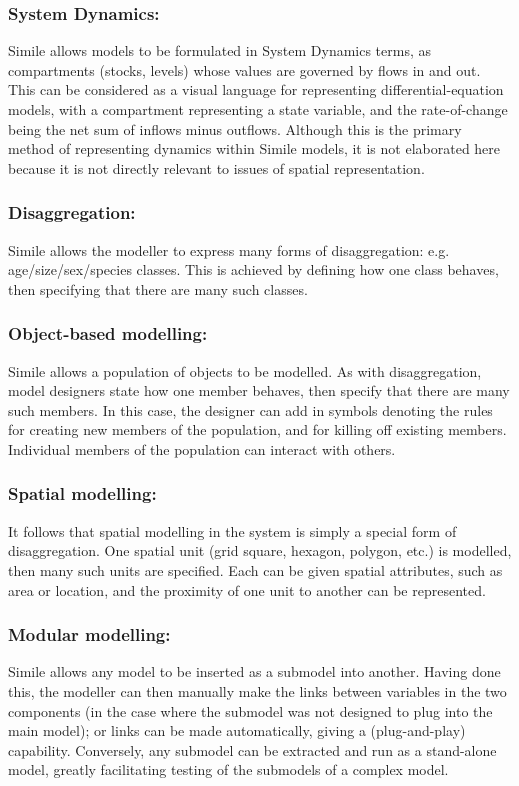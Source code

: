 	\subsubsection{System Dynamics:}
Simile allows models to be formulated in System Dynamics terms, as compartments (stocks, levels) whose values are governed by flows in and out. This can be considered as a visual language for representing differential-equation models, with a compartment representing a state variable, and the rate-of-change being the net sum of inflows minus outflows. Although this is the primary method of representing dynamics within Simile models, it is not elaborated here because it is not directly relevant to issues of spatial representation.
	\subsubsection{Disaggregation:}
Simile allows the modeller to express many forms of disaggregation: e.g. age/size/sex/species classes. This is achieved by defining how one class behaves, then specifying that there are many such classes.
	\subsubsection{Object-based modelling:}
Simile allows a population of objects to be modelled. As with disaggregation, model designers state how one member behaves, then specify that there are many such members. In this case, the designer can add in symbols denoting the rules for creating new members of the population, and for killing off existing members. Individual members of the population can interact with others.
	\subsubsection{Spatial modelling:}
It follows that spatial modelling in the system is simply a special form of disaggregation. One spatial unit (grid square, hexagon, polygon, etc.) is modelled, then many such units are specified. Each can be given spatial attributes, such as area or location, and the proximity of one unit to another can be represented.
	\subsubsection{Modular modelling:}
Simile allows any model to be inserted as a submodel into another. Having done this, the modeller can then manually make the links between variables in the two components (in the case where the submodel was not designed to plug into the main model); or links can be made automatically, giving a (plug-and-play) capability. Conversely, any submodel can be extracted and run as a stand-alone model, greatly facilitating testing of the submodels of a complex model.
